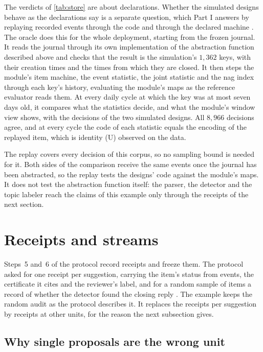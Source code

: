 \documentclass[11pt]{article}
\theoremstyle{definition}
\theoremstyle{plain}
\begin{document}
The verdicts of \cref{tab:store} are about declarations. Whether the simulated designs behave as
the declarations say is a separate question, which Part I answers by replaying recorded events
through the code and through the declared machine \cite[Section~3.4]{part1}. The oracle does this
for the whole deployment, starting from the frozen journal. It reads the journal through its own
implementation of the abstraction function described above and checks that the result is the
simulation's $1{,}362$ keys, with their creation times and the times from which they are closed. It
then steps the module's item machine, the event statistic, the joint statistic and the nag index
through each key's history, evaluating the module's maps as the reference evaluator reads them. At
every daily cycle at which the key was at most seven days old, it compares what the statistics
decide, and what the module's window view shows, with the decisions of the two simulated designs.
All $8{,}966$ decisions agree, and at every cycle the code of each statistic equals the encoding of
the replayed item, which is identity (U) observed on the data.

The replay covers every decision of this corpus, so no sampling bound is needed for it. Both sides
of the comparison receive the same events once the journal has been abstracted, so the replay tests
the designs' code against the module's maps. It does not test the abstraction function itself: the
parser, the detector and the topic labeler reach the claims of this example only through the
receipts of the next section.
\section{Receipts and streams}\label{sec:receipts}

Steps~5 and~6 of the protocol record receipts and freeze them. The protocol asked for one receipt
per suggestion, carrying the item's status from events, the certificate it cites and the reviewer's
label, and for a random sample of items a record of whether the detector found the closing reply
\cite[Section~9]{part2}. The example keeps the random audit as the protocol describes it. It
replaces the receipts per suggestion by receipts at other units, for the reason the next subsection
gives.

\subsection{Why single proposals are the wrong unit}\label{sec:units}
\end{document}
